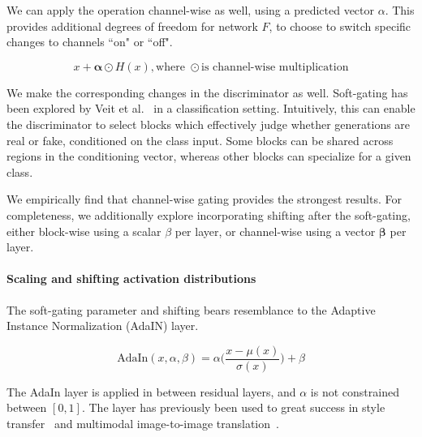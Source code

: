 We can apply the operation channel-wise as well, using a predicted vector $\alpha$. This provides additional degrees of freedom for network $F$, to choose to switch specific changes to channels ``on" or ``off".

\begin{equation}
x + \mathbf{\alpha} \odot H(x), \text{where } \odot \text{is channel-wise multiplication}
\end{equation}

We make the corresponding changes in the discriminator as well. Soft-gating has been explored by Veit et al.~\cite{veit2018adaptive} in a classification setting. Intuitively, this can enable the discriminator to select blocks which effectively judge whether generations are real or fake, conditioned on the class input.
Some blocks can be shared across regions in the conditioning vector, whereas other blocks can specialize for a given class.

We empirically find that channel-wise gating provides the strongest results. For completeness, we additionally explore incorporating shifting after the soft-gating, either block-wise using a scalar $\beta$ per layer, or channel-wise using a vector $\mathbf{\beta}$ per layer.

\paragraph{Scaling and shifting activation distributions} The soft-gating parameter and shifting bears resemblance to the Adaptive Instance Normalization (AdaIN) layer.

\begin{equation}
\text{AdaIn}(x, \alpha, \beta) = \alpha \big(\frac{x-\mu(x)}{\sigma(x)}\big)+\beta
\label{eqn:adain}
\end{equation}

The AdaIn layer is applied in between residual layers, and $\alpha$ is not constrained between $[0,1]$. The layer has previously been used to great success in style transfer~\cite{huang2017arbitrary} and multimodal image-to-image translation~\cite{XX}.

